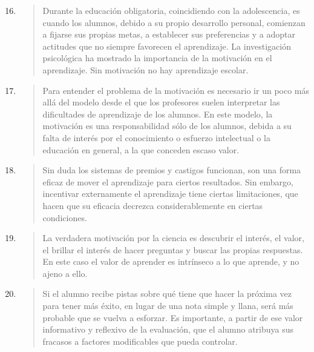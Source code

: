 \documentclass{article}
\begin{document}
\begin{enumerate}
  \setcounter{enumi}{15}

  \item \begin{quote}
  Durante la educación obligatoria, coincidiendo con la adolescencia, es cuando los alumnos, debido a su propio desarrollo personal, comienzan a fijarse sus propias metas, a establecer sus preferencias y a adoptar actitudes que no siempre favorecen el aprendizaje. La investigación psicológica ha mostrado la importancia de la motivación en el aprendizaje. Sin motivación no hay aprendizaje escolar.
  \end{quote}

  \item \begin{quote}
  Para entender el problema de la motivación es necesario ir un poco más allá del modelo desde el que los profesores suelen interpretar las dificultades de aprendizaje de los alumnos. En este modelo, la motivación es una responsabilidad sólo de los alumnos, debida a su falta de interés por el conocimiento o esfuerzo intelectual o la educación en general, a la que conceden escaso valor.
  \end{quote}

  \item \begin{quote}
  Sin duda los sistemas de premios y castigos funcionan, son una forma eficaz de mover el aprendizaje para ciertos resultados. Sin embargo, incentivar externamente el aprendizaje tiene ciertas limitaciones, que hacen que su eficacia decrezca considerablemente en ciertas condiciones.
  \end{quote}

  \item \begin{quote}
  La verdadera motivación por la ciencia es descubrir el interés, el valor, el brillar el interés de hacer preguntas y buscar las propias respuestas. En este caso el valor de aprender es intrínseco a lo que aprende, y no ajeno a ello.
  \end{quote}

  \item \begin{quote}
  Si el alumno recibe pistas sobre qué tiene que hacer la próxima vez para tener más éxito, en lugar de una nota simple y llana, será más probable que se vuelva a esforzar. Es importante, a partir de ese valor informativo y reflexivo de la evaluación, que el alumno atribuya sus fracasos a factores modificables que pueda controlar.
  \end{quote}
\end{enumerate}



 
\end{document}
